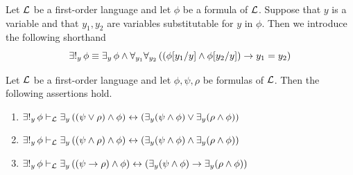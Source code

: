 \documentclass[10pt]{amsart}
\begin{document}
\begin{remark}\label{remark:unique_existential_quantifier}
  Let ${\mathcal L}$ be a first-order language and let $\phi$ be a formula of ${\mathcal L}$. Suppose that $y$ is a variable and that $y_1,y_2$ are variables substitutable for $y$ in $\phi$. Then we introduce the following shorthand
  $$\exists!_y\,\phi \equiv \exists_y\,\phi \wedge \forall_{y_1}\forall_{y_2}\left((\phi[y_1/y]\wedge \phi[y_2/y]) \rightarrow y_1 = y_2\right)$$
\end{remark}

\begin{proposition}\label{proposition:interplay_between_existential_quantifier_and_connectives_under_unique_existential_quantifier}
	Let ${\mathcal L}$ be a first-order language and let $\phi, \psi, \rho$ be formulas of ${\mathcal L}$. Then the following assertions hold.
	\begin{enumerate}[label=\emph{\textbf{(\arabic*)}}, leftmargin=3.0em]
    \item $\exists!_y\,\phi \vdash_{{\mathcal L}} \exists_y\left((\psi \vee \rho)\wedge \phi\right) \leftrightarrow \left(\exists_y(\psi \wedge \phi) \vee \exists_y(\rho \wedge \phi)\right)$
    \item $\exists!_y\,\phi \vdash_{{\mathcal L}} \exists_y\left((\psi \wedge \rho)\wedge \phi\right) \leftrightarrow \left(\exists_y(\psi \wedge \phi) \wedge \exists_y(\rho \wedge \phi)\right)$
    \item $\exists!_y\,\phi \vdash_{{\mathcal L}} \exists_y\left((\psi \rightarrow \rho) \wedge \phi\right) \leftrightarrow \left(\exists_y(\psi \wedge \phi) \rightarrow \exists_y(\rho \wedge \phi)\right)$
	\end{enumerate}
\end{proposition}
\end{document}
